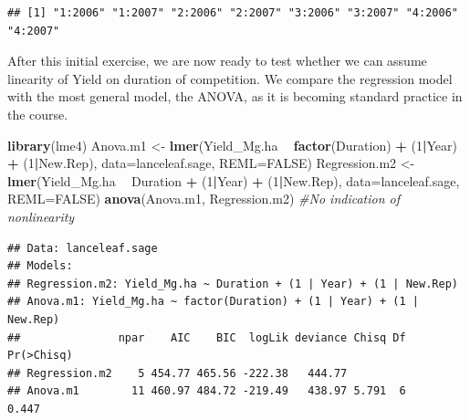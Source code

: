\documentclass[letterpaper,]{book}
\newenvironment{Shaded}{\begin{snugshade}}{\end{snugshade}}
\newcommand{\CommentTok}[1]{\textcolor[rgb]{0.56,0.35,0.01}{\textit{#1}}}
\newcommand{\DataTypeTok}[1]{\textcolor[rgb]{0.13,0.29,0.53}{#1}}
\newcommand{\DecValTok}[1]{\textcolor[rgb]{0.00,0.00,0.81}{#1}}
\newcommand{\KeywordTok}[1]{\textcolor[rgb]{0.13,0.29,0.53}{\textbf{#1}}}
\newcommand{\NormalTok}[1]{#1}
\newcommand{\OperatorTok}[1]{\textcolor[rgb]{0.81,0.36,0.00}{\textbf{#1}}}
\newcommand{\OtherTok}[1]{\textcolor[rgb]{0.56,0.35,0.01}{#1}}
\newcommand{\StringTok}[1]{\textcolor[rgb]{0.31,0.60,0.02}{#1}}
\begin{document}
\begin{Shaded}
\end{Shaded}

\begin{verbatim}
## [1] "1:2006" "1:2007" "2:2006" "2:2007" "3:2006" "3:2007" "4:2006" "4:2007"
\end{verbatim}

After this initial exercise, we are now ready to test whether we can assume linearity of Yield on duration of competition. We compare the regression model with the most general model, the ANOVA, as it is becoming standard practice in the course.

\begin{Shaded}
\begin{Highlighting}[]
\KeywordTok{library}\NormalTok{(lme4)}
\NormalTok{Anova.m1 <-}\StringTok{ }\KeywordTok{lmer}\NormalTok{(Yield_Mg.ha }\OperatorTok{~}\StringTok{ }\KeywordTok{factor}\NormalTok{(Duration) }\OperatorTok{+}\StringTok{ }\NormalTok{(}\DecValTok{1}\OperatorTok{|}\NormalTok{Year) }\OperatorTok{+}\StringTok{ }\NormalTok{(}\DecValTok{1}\OperatorTok{|}\NormalTok{New.Rep),}
                 \DataTypeTok{data=}\NormalTok{lanceleaf.sage, }\DataTypeTok{REML=}\OtherTok{FALSE}\NormalTok{)}
\NormalTok{Regression.m2 <-}\StringTok{ }\KeywordTok{lmer}\NormalTok{(Yield_Mg.ha }\OperatorTok{~}\StringTok{ }\NormalTok{Duration }\OperatorTok{+}\StringTok{ }\NormalTok{(}\DecValTok{1}\OperatorTok{|}\NormalTok{Year) }\OperatorTok{+}\StringTok{ }\NormalTok{(}\DecValTok{1}\OperatorTok{|}\NormalTok{New.Rep),}
                      \DataTypeTok{data=}\NormalTok{lanceleaf.sage, }\DataTypeTok{REML=}\OtherTok{FALSE}\NormalTok{)}
\KeywordTok{anova}\NormalTok{(Anova.m1, Regression.m2) }\CommentTok{#No indication of nonlinearity}
\end{Highlighting}
\end{Shaded}

\begin{verbatim}
## Data: lanceleaf.sage
## Models:
## Regression.m2: Yield_Mg.ha ~ Duration + (1 | Year) + (1 | New.Rep)
## Anova.m1: Yield_Mg.ha ~ factor(Duration) + (1 | Year) + (1 | New.Rep)
##               npar    AIC    BIC  logLik deviance Chisq Df Pr(>Chisq)
## Regression.m2    5 454.77 465.56 -222.38   444.77                    
## Anova.m1        11 460.97 484.72 -219.49   438.97 5.791  6      0.447
\end{verbatim}
\end{document}
